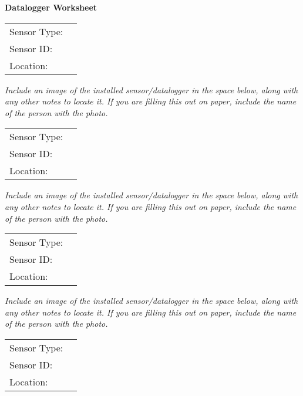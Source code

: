 \documentclass[./main.tex]{subfiles}
\begin{document}
\begin{center}
\Large\textbf{Datalogger Worksheet}
\end{center}

\noindent\begin{tabularx}{\textwidth}{@{}lX@{}}
Sensor Type: & \hrulefill \\[2ex]
Sensor ID: & \hrulefill \\[2ex]
Location: & \hrulefill \\[2ex]
\end{tabularx}

\noindent \emph{Include an image of the installed sensor/datalogger in the space below,  along with any other notes to locate it.  If you are filling this out on paper, include the name of the person with the photo. }

\vspace{8cm}

\noindent\begin{tabularx}{\textwidth}{@{}lX@{}}
Sensor Type: & \hrulefill \\[2ex]
Sensor ID: & \hrulefill \\[2ex]
Location: & \hrulefill \\[2ex]
\end{tabularx}

\noindent \emph{Include an image of the installed sensor/datalogger in the space below,  along with any other notes to locate it.  If you are filling this out on paper, include the name of the person with the photo. }

\vspace{8cm}

\noindent\begin{tabularx}{\textwidth}{@{}lX@{}}
Sensor Type: & \hrulefill \\[2ex]
Sensor ID: & \hrulefill \\[2ex]
Location: & \hrulefill \\[2ex]
\end{tabularx}

\noindent \emph{Include an image of the installed sensor/datalogger in the space below,  along with any other notes to locate it.  If you are filling this out on paper, include the name of the person with the photo. }

\vspace{8cm}

\noindent\begin{tabularx}{\textwidth}{@{}lX@{}}
Sensor Type: & \hrulefill \\[2ex]
Sensor ID: & \hrulefill \\[2ex]
Location: & \hrulefill \\[2ex]
\end{tabularx}
\end{document}
